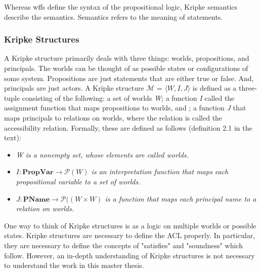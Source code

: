 \documentclass[../../main/main.tex]{subfiles}
\begin{document}
Whereas \gls{wff}s define the syntax of the propositional logic, Kripke semantics describe the semantics.  Semantics refers to the meaning of statements. 

\subsubsection{Kripke Structures}
A Kripke structure primarily deals with three things: worlds, propositions, and principals.  The worlds can be thought of as possible states or configurations of some system.  Propositions are just statements that are either true or false.  And, principals are just actors.  A Kripke structure $\mathcal{M}$ = $\langle \textit{W}, \textit{I}, \textit{J} \rangle $  is defined as a three-tuple consisting of the following: a set of worlds \textit{W}; a function \textit{I} called the assignment function that maps propositions to worlds, and ; a function \textit{J} that maps principals to relations on worlds, where the relation is called the accessibility relation.  Formally, these are defined as follows (definition 2.1 in the text): 

\begin{itemize}
\item \textit{W is a nonempty set, whose elements are called worlds.}
\item \textit{$I: \mathbf{PropVar} \rightarrow \mathcal{P}(W)$ is an interpretation function that maps each propositional variable to a set of worlds.}
\item \textit{$J: \mathbf{PName} \rightarrow \mathcal{P}((W \times W)$ is a function that maps each principal name to a relation on worlds.}
\end{itemize}

One way to think of Kripke structures is as a logic on multiple worlds or possible states.  
%
%
%
Kripke structures are necessary to define the ACL properly.  In particular, they are necessary to define the concepts of "satisfies" and "soundness" which follow.  However, an in-depth understanding of Kripke structures is not necessary to understand the work in this master thesis.  
\end{document}
